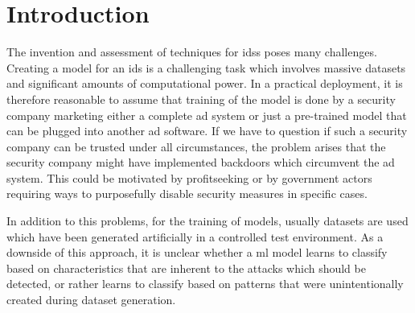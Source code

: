 \documentclass[10pt,sigconf,letterpaper,dvipsnames]{acmart}
\begin{document}

\maketitle

\section{Introduction}

The invention and assessment of techniques for \glspl{ids} poses many challenges. Creating a model for an \gls{ids} is a challenging task which involves massive datasets and significant amounts of computational power. In a practical deployment, it is therefore reasonable to assume that training of the model is done by a security company marketing either a complete \gls{ad} system or just a pre-trained model that can be plugged into another \gls{ad} software. %
If we have to question if such a security company can be trusted under all circumstances, the problem arises that the security company might have implemented backdoors which circumvent the \gls{ad} system. This could be motivated by profitseeking or by government actors requiring ways to purposefully disable security measures in specific cases.

In addition to this problems, for the training of models, usually datasets are used which have been generated artificially in a controlled test environment. As a downside of this approach, it is unclear whether a \gls{ml} model learns to classify based on characteristics that are inherent to the attacks which should be detected, or rather learns to classify based on patterns that were unintentionally created during dataset generation.
\end{document}
